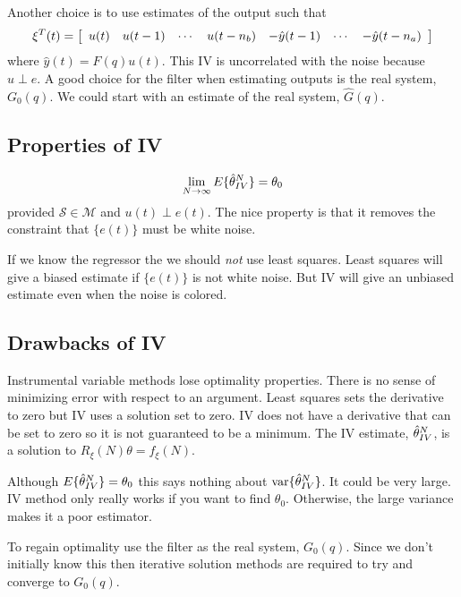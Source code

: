 Another choice is to use estimates of the output such that
$$\xi^T(t) = \left[\begin{array}{c c c c c c c} u(t) & u(t-1) & \cdots & u(t-n_b) & -\hat{y}(t-1) & \cdots & -\hat{y}(t-n_a) \end{array}\right]$$
where $\hat{y}(t)=F(q)u(t)$. This IV is uncorrelated with the noise because $u\perp e$. A good choice for the filter when estimating outputs is the real system, $G_0(q)$. We could start with an estimate of the real system, $\hat{G}(q)$.

\subsection{Properties of IV}
$$\lim_{N\to\infty}E\{\hat{\theta}_{IV}^N\} = \theta_0$$
provided $\mathcal{S}\in\mathcal{M}$ and $u(t)\perp e(t)$. The nice property is that it removes the constraint that $\{e(t)\}$ must be white noise.

If we know the regressor the we should \textit{not} use least squares. Least squares will give a biased estimate if $\{e(t)\}$ is not white noise. But IV will give an unbiased estimate even when the noise is colored.

\subsection{Drawbacks of IV}
Instrumental variable methods lose optimality properties. There is no sense of minimizing error with respect to an argument. Least squares sets the derivative to zero but IV uses a solution set to zero. IV does not have a derivative that can be set to zero so it is not guaranteed to be a minimum. The IV estimate, $\hat{\theta}_{IV}^N$, is a solution to $R_\xi(N)\theta=f_\xi(N)$.

Although $E\{\hat{\theta}_{IV}^N\}=\theta_0$ this says nothing about $\text{var}\{\hat{\theta}_{IV}^N\}$. It could be very large. IV method only really works if you want to find $\theta_0$. Otherwise, the large variance makes it a poor estimator.

To regain optimality use the filter as the real system, $G_0(q)$. Since we don't initially know this then iterative solution methods are required to try and converge to $G_0(q)$.

